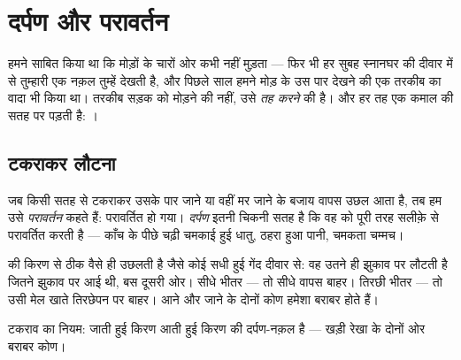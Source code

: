 \chapter{दर्पण और परावर्तन}\label{ch:g5:mirrors-reflection}

हमने साबित किया था कि  मोड़ों के चारों ओर कभी नहीं मुड़ता ---
फिर भी हर सुबह स्नानघर की दीवार में से तुम्हारी एक नक़ल तुम्हें देखती
है, और पिछले साल हमने मोड़ के उस पार देखने की एक तरकीब का वादा भी
किया था। तरकीब सड़क को मोड़ने की नहीं, उसे \emph{तह करने} की है। और
हर तह एक कमाल की सतह पर पड़ती है: ।

\section{टकराकर लौटना}

\begin{definition}[परावर्तन]\label{def:g5:mirrors-reflection:reflection}
जब  किसी सतह से टकराकर उसके पार जाने या वहीं मर जाने के बजाय
वापस उछल आता है, तब हम उसे \emph{परावर्तन} कहते हैं:
 परावर्तित हो गया। \emph{दर्पण} इतनी चिकनी सतह है
कि वह  को पूरी तरह सलीक़े से परावर्तित करती है --- काँच के पीछे
चढ़ी चमकाई हुई धातु, ठहरा हुआ पानी, चमकता चम्मच।
\end{definition}

\begin{proposition}[टकराव का नियम]\label{prop:g5:mirrors-reflection:bounce}
 की किरण  से ठीक वैसे ही उछलती है जैसे कोई सधी हुई गेंद
दीवार से: वह उतने ही झुकाव पर लौटती है जितने झुकाव पर आई थी, बस दूसरी
ओर। सीधे भीतर --- तो सीधे वापस बाहर। तिरछी भीतर --- तो उसी मेल खाते
तिरछेपन पर बाहर। आने और जाने के दोनों कोण हमेशा बराबर होते हैं।
\end{proposition}

\begin{omfigure}

{\small टकराव का नियम: जाती हुई किरण आती हुई किरण की दर्पण-नक़ल है
--- खड़ी रेखा के दोनों ओर बराबर कोण।}
\end{omfigure}


